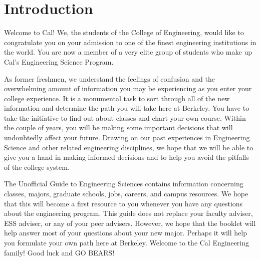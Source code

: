 \chapter*{Introduction}

Welcome to Cal! We, the students of the College of Engineering, would like to congratulate you on your admission to one of the finest engineering institutions in the world. You are now a member of a very elite group of students who make up Cal's Engineering Science Program.

As former freshmen, we understand the feelings of confusion and the overwhelming amount of information you may be experiencing as you enter your college experience. It is a monumental task to sort through all of the new information and determine the path you will take here at Berkeley. You have to take the initiative to find out about classes and chart your own course. Within the couple of years, you will be making some important decisions that will undoubtedly affect your future. Drawing on our past experiences in Engineering Science and other related engineering disciplines, we hope that we will be able to give you a hand in making informed decisions and to help you avoid the pitfalls of the college system.

The Unofficial Guide to Engineering Sciences contains information concerning classes, majors, graduate schools, jobs, careers, and campus resources. We hope that this will become a first resource to you whenever you have any questions about the engineering program. This guide does not replace your faculty adviser, ESS adviser, or any of your peer advisers. However, we hope that the booklet will help answer most of your questions about your new major. Perhaps it will help you formulate your own path here at Berkeley. Welcome to the Cal Engineering family! Good luck and GO BEARS!

